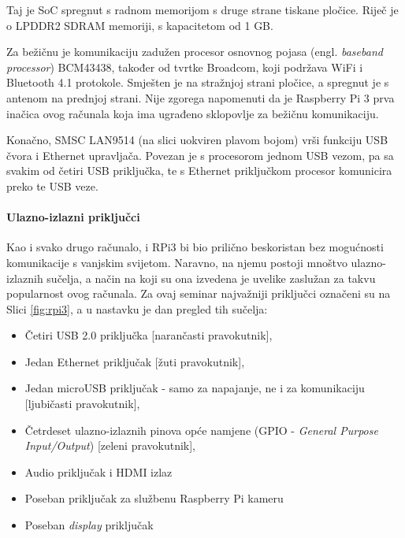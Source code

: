 \documentclass[12pt,a4paper]{article}
\begin{document}
		\par Taj je SoC spregnut s radnom memorijom s druge strane tiskane pločice. Riječ je o LPDDR2 SDRAM memoriji, s kapacitetom od 1 GB.

		\par Za bežičnu je komunikaciju zadužen procesor osnovnog pojasa (engl. \textit{baseband processor}) BCM43438, također od tvrtke Broadcom, koji podržava WiFi i Bluetooth 4.1 protokole. Smješten je na stražnjoj strani pločice, a spregnut je s antenom na prednjoj strani. Nije zgorega napomenuti da je Raspberry Pi 3 prva inačica ovog računala koja ima ugrađeno sklopovlje za bežičnu komunikaciju.

		\par Konačno, SMSC LAN9514 (na slici uokviren plavom bojom) vrši funkciju USB čvora i Ethernet upravljača. Povezan je s procesorom jednom USB vezom, pa sa svakim od četiri USB priključka, te s Ethernet priključkom procesor komunicira preko te USB veze.

		\paragraph{Ulazno-izlazni priključci} %
		\label{par:IO_ports}
		
		Kao i svako drugo računalo, i RPi3 bi bio prilično beskoristan bez mogućnosti komunikacije s vanjskim svijetom. Naravno, na njemu postoji mnoštvo ulazno-izlaznih sučelja, a način na koji su ona izvedena je uvelike zaslužan za takvu popularnost ovog računala. Za ovaj seminar najvažniji priključci označeni su na Slici \ref{fig:rpi3}, a u nastavku je dan pregled tih sučelja:
		\begin{itemize}
			\item Četiri USB 2.0 priključka [narančasti pravokutnik],
			\item Jedan Ethernet priključak [žuti pravokutnik],
			\item Jedan microUSB priključak - samo za napajanje, ne i za komunikaciju [ljubičasti pravokutnik],
			\item Četrdeset ulazno-izlaznih pinova opće namjene (GPIO - \textit{General Purpose Input/Output}) [zeleni pravokutnik],
			\item Audio priključak i HDMI izlaz
			\item Poseban priključak za službenu Raspberry Pi kameru
			\item Poseban \textit{display} priključak
		\end{itemize}
\end{document}
